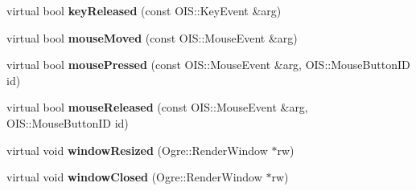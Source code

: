 \begin{DoxyCompactItemize}
\item 
\hypertarget{class_whitedrop_1_1_whitedrop_engine_a6327f2255960cc775f27af22e6098783}{virtual bool {\bfseries key\+Released} (const O\+I\+S\+::\+Key\+Event \&arg)}\label{class_whitedrop_1_1_whitedrop_engine_a6327f2255960cc775f27af22e6098783}

\item 
\hypertarget{class_whitedrop_1_1_whitedrop_engine_a6b7a92f35fcd31a2c1e39807c03b17be}{virtual bool {\bfseries mouse\+Moved} (const O\+I\+S\+::\+Mouse\+Event \&arg)}\label{class_whitedrop_1_1_whitedrop_engine_a6b7a92f35fcd31a2c1e39807c03b17be}

\item 
\hypertarget{class_whitedrop_1_1_whitedrop_engine_ac1a5a8c8270366a0a95e607b63bedc65}{virtual bool {\bfseries mouse\+Pressed} (const O\+I\+S\+::\+Mouse\+Event \&arg, O\+I\+S\+::\+Mouse\+Button\+I\+D id)}\label{class_whitedrop_1_1_whitedrop_engine_ac1a5a8c8270366a0a95e607b63bedc65}

\item 
\hypertarget{class_whitedrop_1_1_whitedrop_engine_aba59169e7245b8a87731914c6572769d}{virtual bool {\bfseries mouse\+Released} (const O\+I\+S\+::\+Mouse\+Event \&arg, O\+I\+S\+::\+Mouse\+Button\+I\+D id)}\label{class_whitedrop_1_1_whitedrop_engine_aba59169e7245b8a87731914c6572769d}

\item 
\hypertarget{class_whitedrop_1_1_whitedrop_engine_a0bb647d9c7774430fcc433504b7f62a1}{virtual void {\bfseries window\+Resized} (Ogre\+::\+Render\+Window $\ast$rw)}\label{class_whitedrop_1_1_whitedrop_engine_a0bb647d9c7774430fcc433504b7f62a1}

\item 
\hypertarget{class_whitedrop_1_1_whitedrop_engine_a8022db5bf66a9d478cc531b62cf3e863}{virtual void {\bfseries window\+Closed} (Ogre\+::\+Render\+Window $\ast$rw)}\label{class_whitedrop_1_1_whitedrop_engine_a8022db5bf66a9d478cc531b62cf3e863}

\end{DoxyCompactItemize}
